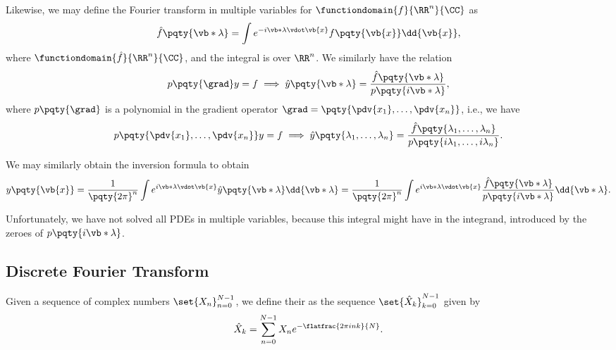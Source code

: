 Likewise, we may define the Fourier transform in multiple variables for \(\functiondomain{f}{\RR^n}{\CC}\) as
\begin{equation}
    \hat{f}\pqty{\vb*{\lambda}} = \int e^{- i \vb*{\lambda} \vdot \vb{x}} f\pqty{\vb{x}} \dd{\vb{x}},
\end{equation}
where \(\functiondomain{\hat{f}}{\RR^n}{\CC}\), and the integral is over \(\RR^n\). We similarly have the relation
\begin{equation}
    p\pqty{\grad} y = f \implies \hat{y} \pqty{\vb*{\lambda}} = \frac{\hat{f}\pqty{\vb*{\lambda}}}{p\pqty{i \vb*{\lambda}}},
\end{equation}
where \(p\pqty{\grad}\) is a polynomial in the gradient operator \(\grad = \pqty{\pdv{x_1}, \ldots, \pdv{x_n}}\), i.e., we have
\begin{equation}
    p\pqty{\pdv{x_1}, \ldots, \pdv{x_n}} y = f \implies \hat{y} \pqty{\lambda_1, \ldots, \lambda_n} = \frac{\hat{f}\pqty{\lambda_1, \ldots, \lambda_n}}{p\pqty{i \lambda_1, \ldots, i \lambda_n}}.
\end{equation}

We may similarly obtain the inversion formula to obtain
\begin{equation}
    y\pqty{\vb{x}} = \frac{1}{\pqty{2 \pi}^n} \int e^{i \vb*{\lambda} \vdot \vb{x}} \hat{y}\pqty{\vb*{\lambda}} \dd{\vb*{\lambda}} = \frac{1}{\pqty{2 \pi}^n} \int e^{i \vb*{\lambda} \vdot \vb{x}} \frac{\hat{f}\pqty{\vb*{\lambda}}}{p\pqty{i \vb*{\lambda}}} \dd{\vb*{\lambda}}.
\end{equation}

Unfortunately, we have not solved all PDEs in multiple variables, because this integral might have  in the integrand, introduced by the zeroes of \(p\pqty{i \vb*{\lambda}}\).

\subsection{Discrete Fourier Transform}

Given a sequence of complex numbers \(\set{X_n}_{n = 0}^{N - 1}\), we define their  as the sequence \(\set{\hat{X}_k}_{k = 0}^{N - 1}\) given by
\begin{equation}
    \hat{X}_k = \sum_{n = 0}^{N - 1} X_n e^{- \flatfrac{2 \pi i n k}{N}}.
\end{equation}

